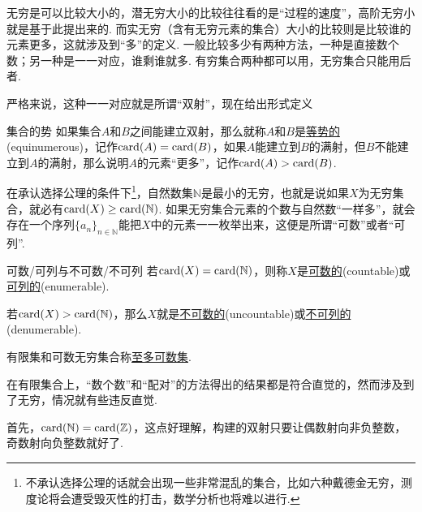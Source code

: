 \documentclass[main.tex]{subfiles}
\begin{document}
无穷是可以比较大小的，潜无穷大小的比较往往看的是“过程的速度”，高阶无穷小就是基于此提出来的. 而实无穷（含有无穷元素的集合）大小的比较则是比较谁的元素更多，这就涉及到“多”的定义. 一般比较多少有两种方法，一种是直接数个数；另一种是一一对应，谁剩谁就多. 有穷集合两种都可以用，无穷集合只能用后者.

严格来说，这种一一对应就是所谓“双射”，现在给出形式定义
\begin{definition}{集合的势}
    如果集合\(A\)和\(B\)之间能建立双射，那么就称\(A\)和\(B\)是\uline{等势的}(equinumerous)，记作\({\rm card}(A)={\rm card}(B)\)，如果\(A\)能建立到\(B\)的满射，但\(B\)不能建立到\(A\)的满射，那么说明\(A\)的元素“更多”，记作\({\rm card}(A)>{\rm card}(B)\).
\end{definition}

在承认选择公理的条件下\footnote{不承认选择公理的话就会出现一些非常混乱的集合，比如六种戴德金无穷，测度论将会遭受毁灭性的打击，数学分析也将难以进行.}，自然数集\(\mathbb{N}\)是最小的无穷，也就是说如果\(X\)为无穷集合，就必有\({\rm card}(X)\geq{\rm card}(\mathbb{N})\). 如果无穷集合元素的个数与自然数“一样多”，就会存在一个序列\(\{a_n\}_{n\in\mathbb{N}}\)能把\(X\)中的元素一一枚举出来，这便是所谓“可数”或者“可列”.

\begin{definition}{可数/可列与不可数/不可列}
    若\({\rm card}(X)={\rm card}(\mathbb{N})\)，则称\(X\)是\uline{可数的}(countable)或\uline{可列的}(enumerable). 
    \par
    若\({\rm card}(X)>{\rm card}(\mathbb{N})\)，那么\(X\)就是\uline{不可数的}(uncountable)或\uline{不可列的}(denumerable).
    \par
    有限集和可数无穷集合称\uline{至多可数集}.
\end{definition}

在有限集合上，“数个数”和“配对”的方法得出的结果都是符合直觉的，然而涉及到了无穷，情况就有些违反直觉.

首先，\({\rm card}(\mathbb{N})={\rm card}(\mathbb{Z})\)，这点好理解，构建的双射只要让偶数射向非负整数，奇数射向负整数就好了.
\end{document}
